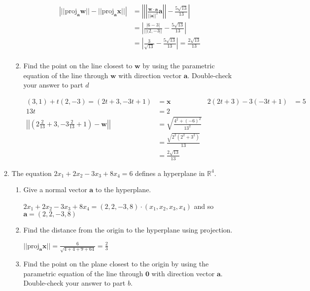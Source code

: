 \documentclass[letterpaper]{article}
\begin{document}
\begin{enumerate}
\begin{enumerate}
\begin{enumerate}
      \begin{align*}
        \left\lvert||\text{proj}_{\mathbf{a}}\mathbf{w}||-||\text{proj}_{\mathbf{a}}\mathbf{\mathbf{x}}||\right\rvert&=\left\lvert\left\lvert\left\lvert\frac{\mathbf{w}\cdot\mathbf{a}}{||\mathbf{a}||^2}\mathbf{a}\right\rvert\right\rvert-\frac{5\sqrt{13}}{13}\right\rvert\\
        &=\left\lvert\frac{|6-3|}{||(2,-3||}-\frac{5\sqrt{13}}{13}\right\rvert\\
        &=\left\lvert\frac{3}{\sqrt{13}}-\frac{5\sqrt{13}}{13}\right\rvert=\frac{2\sqrt{13}}{13}\\
      \end{align*}
    \item
      Find the point on the line closest to $\mathbf{w}$ by using the parametric equation of the line through $\mathbf{w}$ with direction vector $\mathbf{a}$. Double-check your answer to part $d$

      \begin{align*}
      (3,1)+t(2,-3)=(2t+3,-3t+1)&=\mathbf{x}&
      2(2t+3)-3(-3t+1)&=5\\
      13t&=2\\
      \left\lvert\left\lvert\left(2\frac{2}{13}+3,-3\frac{2}{13}+1\right)-\mathbf{w}\right\rvert\right\rvert&=\sqrt{\frac{4^2+(-6)^2}{13^2}}\\
      &=\frac{\sqrt{2^2(2^2+3^2)}}{13}\\
      &=\frac{2\sqrt{13}}{13}
      \end{align*}
    \end{enumerate}
  \setcounter{enumii}{8}
  \item
    The equation $2x_1+2x_2-3x_3+8x_4=6$ defines a hyperplane in $\mathbb{R}^4$.
    \begin{enumerate}
    \item
      Give a normal vector $\mathbf{a}$ to the hyperplane.

      $2x_1+2x_2-3x_3+8x_4=(2,2,-3,8)\cdot(x_1,x_2,x_3,x_4)$ and so $\mathbf{a}=(2,2,-3,8)$
    \item
      Find the distance from the origin to the hyperplane using projection.

      $||\text{proj}_{\mathbf{a}}\mathbf{x}||=\frac{6}{\sqrt{4+4+9+64}}=\frac{2}{3}$
    \item
      Find the point on the plane closest to the origin by using the parametric equation of the line through $\mathbf{0}$ with direction vector $\mathbf{a}$. Double-check your answer to part $b$.


\end{enumerate}
\end{enumerate}
\end{enumerate}
\end{document}
